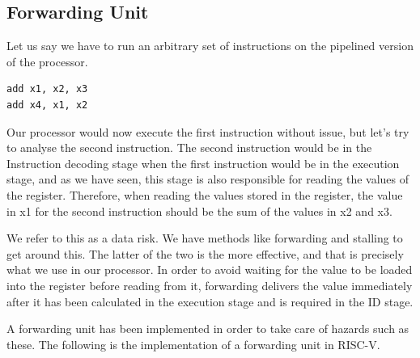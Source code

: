 \documentclass{article}
\begin{document}
\subsection{Forwarding Unit}
Let us say we have to run an arbitrary set of instructions on the pipelined version of the processor. 

\begin{lstlisting}[caption={Arbitrary Set of instructions}, captionpos=b, language=RISC-V]
add x1, x2, x3
add x4, x1, x2
\end{lstlisting}

Our processor would now execute the first instruction without issue, but let's try to analyse the second instruction. The second instruction would be in the Instruction decoding stage when the first instruction would be in the execution stage, and as we have seen, this stage is also responsible for reading the values of the register. Therefore, when reading the values stored in the register, the value in x1 for the second instruction should be the sum of the values in x2 and x3. 

We refer to this as a data risk. We have methods like forwarding and stalling to get around this. The latter of the two is the more effective, and that is precisely what we use in our processor. In order to avoid waiting for the value to be loaded into the register before reading from it, forwarding delivers the value immediately after it has been calculated in the execution stage and is required in the ID stage.

A forwarding unit has been implemented in order to take care of hazards such as these. The following is the implementation of a forwarding unit in RISC-V. 
\end{document}
